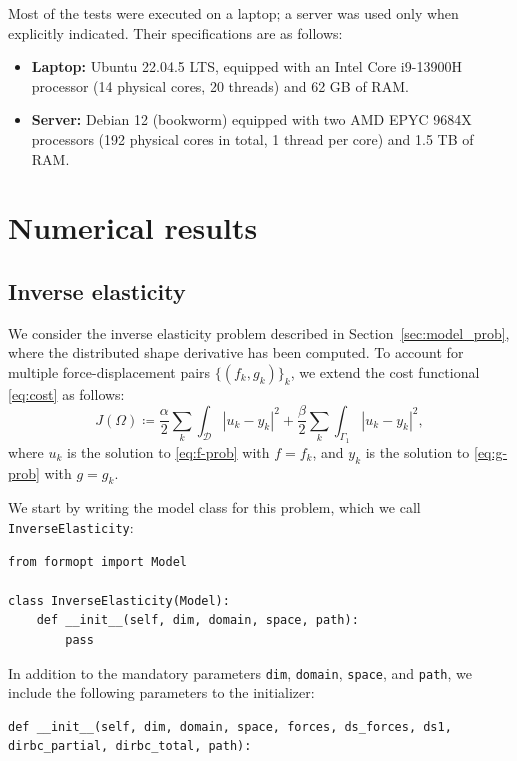 \documentclass[preprint,9pt]{elsarticle}
\begin{document}
Most of the tests were executed on a laptop; a server was used only
when explicitly indicated. Their specifications are as follows:
\begin{itemize}
\item \textbf{Laptop:} Ubuntu 22.04.5 LTS, equipped with an Intel Core i9-13900H
processor (14 physical cores, 20 threads) and 62 GB of RAM.
\item \textbf{Server:} Debian 12 (bookworm) equipped with two AMD EPYC 9684X
processors (192 physical cores in total, 1 thread per core) and 1.5 TB of RAM.
\end{itemize}


\section{Numerical results}\label{sec:results}

\subsection{Inverse elasticity}\label{sec:num_inverse_elasticity}

We consider the inverse elasticity problem
described in Section~\ref{sec:model_prob},
where the distributed shape derivative has been computed.
To account for multiple force-displacement pairs $\{(f_k, g_k)\}_k$,
we extend the cost functional \eqref{eq:cost} as follows:
\begin{equation}
	J(\Omega)\coloneqq
	\frac{\alpha}{2}\sum_{k}\int_{\mathcal{D}}|u_{k}-y_{k}|^{2}+
	\frac{\beta}{2}\sum_{k}\int_{\Gamma_{1}}|u_{k}-y_{k}|^{2},
\end{equation}
where $u_k$ is the solution to \eqref{eq:f-prob} with $f=f_k$,
and $y_k$ is the solution to \eqref{eq:g-prob} with $g=g_k$.

We start by writing the model class for this problem,
which we call \texttt{InverseElasticity}:
\begin{lstlisting}
from formopt import Model

class InverseElasticity(Model):
	def __init__(self, dim, domain, space, path):
		pass
\end{lstlisting}
In addition to the mandatory parameters
\texttt{dim}, \texttt{domain}, \texttt{space}, and \texttt{path},
we include the following parameters to the initializer:
\begin{lstlisting}
def __init__(self, dim, domain, space, forces, ds_forces, ds1, dirbc_partial, dirbc_total, path):
\end{lstlisting}
\end{document}
